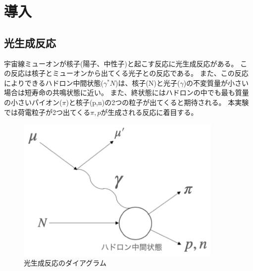 \chapter{導入} \label{cha:introduction}

\section{光生成反応}

宇宙線ミューオンが核子(陽子、中性子)と起こす反応に光生成反応がある。
この反応は核子とミューオンから出てくる光子との反応である。
また、この反応によりできるハドロン中間状態($\gamma ^* N$)は、核子(N)と光子($\gamma$)の不変質量が小さい場合は短寿命の共鳴状態に近い。
また、終状態にはハドロンの中でも最も質量の小さいパイオン($\pi$)と核子(p,n)の2つの粒子が出てくると期待される。
本実験では荷電粒子が2つ出てくる$\pi,p$が生成される反応に着目する。

\begin{figure}[H]
	\centering
	\includegraphics[width=10cm]{img/diagram_photoproduction.png}
	\caption{光生成反応のダイアグラム}
\end{figure}